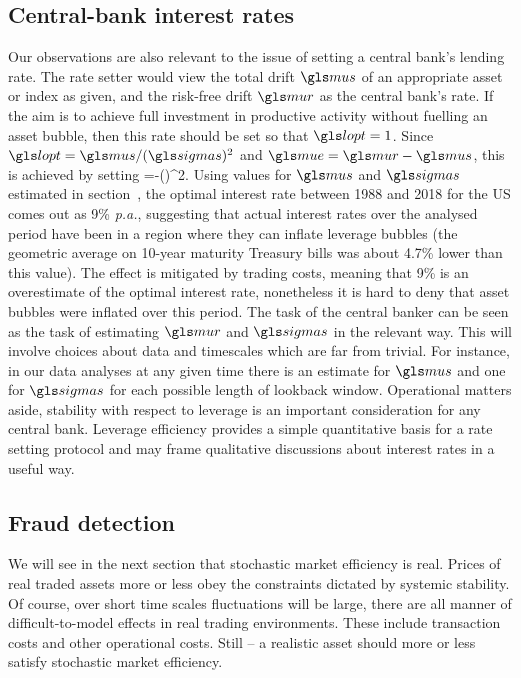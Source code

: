 \subsection{Central-bank interest rates}
Our observations are also relevant to the issue of setting a central bank's lending rate. The rate setter would view the total drift $\mus$ of an appropriate asset or index as given, and the risk-free drift $\mur$ as the central bank's rate. If the aim is to achieve full investment in productive activity without fuelling an asset bubble, then this rate should be set so that $\lopt=1$. Since $\lopt=\mus/(\sigmas)^2$ and $\mue=\mur-\mus$, this is achieved by setting 
\be
\mur=\mus-(\sigmas)^2.
\ee
Using values for $\mus$ and $\sigmas$ estimated in section~, the optimal interest rate between 1988 and 2018 for the US comes out as 9\% {\it p.a.}, suggesting that actual interest rates over the analysed period have been in a region where they can inflate leverage bubbles (the geometric average on 10-year maturity Treasury bills was about 4.7\% \pa lower than this value). The effect is mitigated by trading costs, meaning that 9\% is an overestimate of the optimal interest rate, nonetheless it is hard to deny that asset bubbles were inflated over this period. The task of the central banker can be seen as the task of estimating $\mur$ and $\sigmas$ in the relevant way. This will involve choices about data and timescales which are far from trivial. For instance, in our data analyses at any given time there is an estimate for $\mus$ and one for $\sigmas$ for each possible length of lookback window. Operational matters aside, stability with respect to leverage is an important consideration for any central bank. Leverage efficiency provides a simple quantitative basis for a rate setting protocol and may frame qualitative discussions about interest rates in a useful way.


\subsection{Fraud detection}
We will see in the next section that stochastic market efficiency is real. Prices of real traded assets more or less obey the constraints dictated by systemic stability. Of course, over short time scales fluctuations will be large, there are all manner of difficult-to-model effects in real trading environments. These include transaction costs and other operational costs. Still -- a realistic asset should more or less satisfy stochastic market efficiency.

